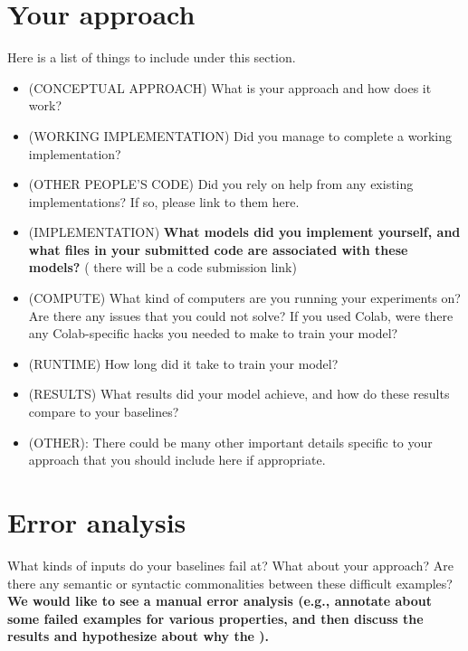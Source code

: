 \documentclass[11pt,a4paper]{article}
\begin{document}
\section{Your approach}
Here is a  list of things to include under this section.
\begin{itemize}
    \item  (CONCEPTUAL APPROACH) What is your approach and how does it work? 
    \item  (WORKING IMPLEMENTATION) Did you manage to complete a working implementation?
   \item (OTHER PEOPLE'S CODE)  Did you rely on help from any existing implementations? If so, please link to them here. 
   \item  (IMPLEMENTATION) \textbf{What models did you implement yourself, and what files in your submitted code are associated with these models?} ( there will be a code submission link)
   \item (COMPUTE) What kind of computers are you running your experiments on? Are there any issues that you could not solve? If you used Colab, were there any Colab-specific hacks you needed to make to train your model? 

   \item (RUNTIME) How long did it take to train your model?

   \item  (RESULTS) What results did your model achieve, and how do these results compare to your baselines? 

   \item (OTHER): There could be many other important details specific to your approach that you should include here if appropriate. 
\end{itemize}

\section{Error analysis}
What kinds of inputs do your baselines fail at? What about your approach? Are there any semantic or syntactic commonalities between these difficult examples? \textbf{We would like to see a manual error analysis (e.g., annotate about some failed examples for various properties, and then discuss the results and hypothesize about why the ).} 
\end{document}
